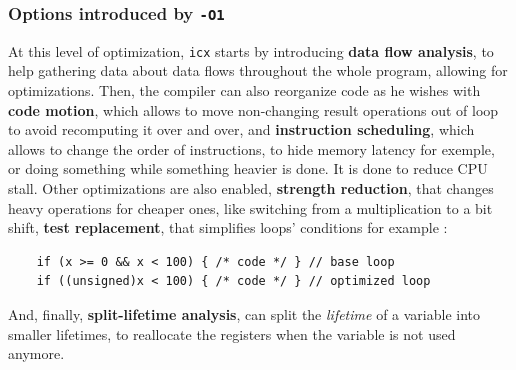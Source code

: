 \documentclass{rapport}
\newcommand{\icx}{\texttt{icx} }
\newcommand{\optione}{\texttt{-O1} }
\begin{document}
\subsubsection{Options introduced by \optione}
At this level of optimization, \icx starts by introducing \textbf{data flow analysis}, to help gathering data about data flows throughout the whole program, allowing for optimizations.
Then, the compiler can also reorganize code as he wishes with \textbf{code motion}, which allows to move non-changing result operations out of loop to avoid recomputing it over and over, and \textbf{instruction scheduling}, which allows to change the order of instructions, to hide memory latency for exemple, or doing something while something heavier is done. It is done to reduce CPU stall.
\newline\newline
Other optimizations are also enabled, \textbf{strength reduction}, that changes heavy operations for cheaper ones, like switching from a multiplication to a bit shift, \textbf{test replacement}, that simplifies loops' conditions for example : 
\begin{verbatim}
    if (x >= 0 && x < 100) { /* code */ } // base loop
    if ((unsigned)x < 100) { /* code */ } // optimized loop
\end{verbatim}
And, finally, \textbf{split-lifetime analysis}, can split the \textit{lifetime} of a variable into smaller lifetimes, to reallocate the registers when the variable is not used anymore.
\end{document}

